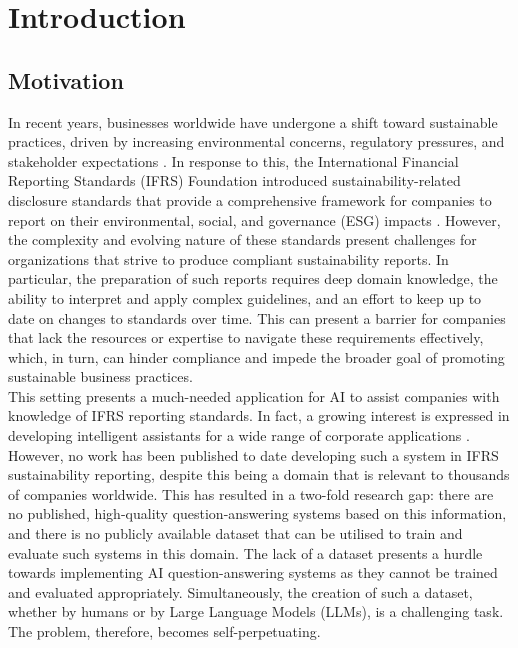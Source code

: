 
\chapter{Introduction}


\section{Motivation}\label{motivations}

In recent years, businesses worldwide have undergone a shift toward sustainable practices, driven by increasing environmental concerns, regulatory pressures, and stakeholder expectations \cite{ey}. In response to this, the International Financial Reporting Standards (IFRS) Foundation introduced sustainability-related disclosure standards that provide a comprehensive framework for companies to report on their environmental, social, and governance (ESG) impacts \citep{ifrsorgc9:online}. However, the complexity and evolving nature of these standards present challenges for organizations that strive to produce compliant sustainability reports. In particular, the preparation of such reports requires deep domain knowledge, the ability to interpret and apply complex guidelines, and an effort to keep up to date on changes to standards over time. This can present a barrier for companies that lack the resources or expertise to navigate these requirements effectively, which, in turn, can hinder compliance and impede the broader goal of promoting sustainable business practices.\\

This setting presents a much-needed application for AI to assist companies with knowledge of IFRS reporting standards. In fact, a growing interest is expressed in developing intelligent assistants for a wide range of corporate applications \cite{nicolescu2022human, kim2024ragqaragintegratinggenerative}. However, no work has been published to date developing such a system in IFRS sustainability reporting, despite this being a domain that is relevant to thousands of companies worldwide. This has resulted in a two-fold research gap: there are no published, high-quality question-answering systems based on this information, and there is no publicly available dataset that can be utilised to train and evaluate such systems in this domain. The lack of a dataset presents a hurdle towards implementing AI question-answering systems as they cannot be trained and evaluated appropriately. Simultaneously, the creation of such a dataset, whether by humans or by Large Language Models (LLMs), is a challenging task. The problem, therefore, becomes self-perpetuating.

